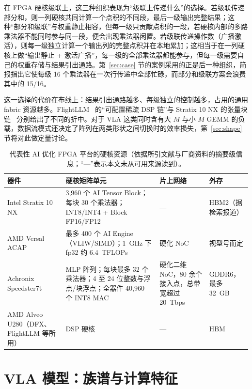 \documentclass[a4paper,10.5pt]{ctexart}
\begin{document}
在 FPGA 硬核级联上，这三种组织表现为“级联上传递什么”的选择。若级联传递部分和，则一列硬核共同计算一个点积的不同段，最后一级输出完整结果；这种“部分和级联”与权重静止相容，但每一级只贡献点积的一段，若硬核内部的多路乘法器不能同时参与同一段，便会出现乘法器闲置。若级联传递操作数（广播激活），则每一级独立计算一个输出列的完整点积并在本地累加；这相当于在一列硬核上做“输出静止 + 激活广播”，每一级的全部乘法器都能参与，但每一级需要自己的权重存储与结果引出通路。第~\ref{sec:case} 节的案例采用的正是后一种组织，简报指出它使每级 16 个乘法器在一次行传递中全部忙碌，而部分和级联方案会浪费其中的 15/16。

这一选择的代价在布线上：结果引出通路越多、每级独立的控制越多，占用的通用 fabric 资源越多。FlightLLM~\cite{flightllm} 的“可配置稀疏 DSP 链”与 Stratix 10 NX 的张量块链~\cite{s10nx_fpga21} 分别给出了不同的折中。对于 VLA 这类同时含有大 $M$ 与小 $M$ GEMM 的负载，数据流模式还决定了阵列在两类形状之间切换时的效率损失，第~\ref{sec:shape} 节将对此做定量讨论。

\begin{table}[t]
\centering
\caption{代表性 AI 优化 FPGA 平台的硬核资源（依据所引文献与厂商资料的摘要级信息；“—”表示本文未从可用来源读到）。}
\label{tab:devices}
\small
\begin{tabularx}{\textwidth}{l Y Y Y}
\toprule
器件 & 硬核矩阵单元 & 片上网络 & 外存 \\
\midrule
Intel Stratix 10 NX~\cite{s10nx_fpga21} & 3,960 个 AI Tensor Block；每块 30 个乘法器；INT8/INT4 + Block FP16/FP12 & — & HBM2（据检索报道） \\
AMD Versal ACAP~\cite{versal_fpga19,charm} & 最多 400 个 AI Engine（VLIW/SIMD）；1~GHz 下 fp32 约 6.4~TFLOPs~\cite{charm} & 硬化 NoC & 视型号而定 \\
Achronix Speedster7t~\cite{achronix} & MLP 阵列；每块最多 32 个乘法器；4 至 24 位整数与浮点/块浮点；全器件 40,960 个 INT8 MAC & 硬化二维 NoC，80 余个接入点，总带宽超过 20~Tbps & GDDR6，最多 32~GB \\
AMD Alveo U280（DFX、FlightLLM 等所用） & DSP 硬核 & — & HBM \\
\bottomrule
\end{tabularx}
\end{table}

\section{VLA 模型：族谱与计算特征}\label{sec:vla}
\end{document}
